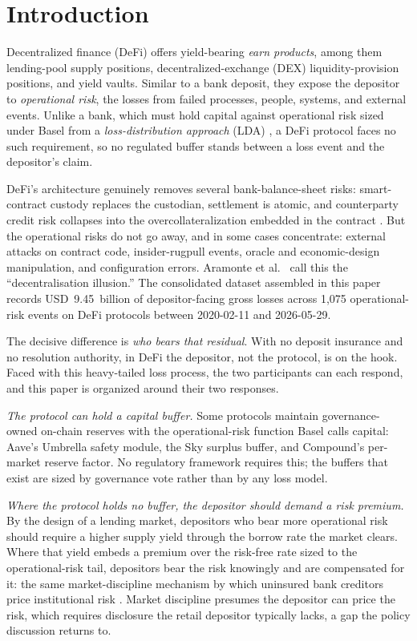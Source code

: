 \documentclass[runningheads]{llncs}
\begin{document}
\section{Introduction}

Decentralized finance (DeFi) offers yield-bearing \emph{earn products},
among them lending-pool supply positions, decentralized-exchange (DEX) liquidity-provision positions,
and yield vaults. Similar to a bank deposit, they expose the depositor
to \emph{operational risk}, the losses from failed processes, people,
systems, and external events. Unlike a bank, which must hold capital
against operational risk sized under Basel from a
\emph{loss-distribution approach} (LDA)
\citep{Moscadelli2004,Fontnouvelle2006,Cope2009,Chernobai2008}, a DeFi
protocol faces no such requirement, so no regulated buffer stands
between a loss event and the depositor's claim.

DeFi's architecture genuinely removes several bank-balance-sheet risks:
smart-contract custody replaces the custodian, settlement is atomic,
and counterparty credit risk collapses into the overcollateralization
embedded in the contract \citep{Werner2022,Auer2024}. But the
operational risks do not go away, and in some cases concentrate:
external attacks on contract code, insider-rugpull events, oracle and
economic-design manipulation, and configuration errors. Aramonte et
al.~\cite{Aramonte2021} call this the ``decentralisation illusion.''
The consolidated dataset assembled in this paper records
USD~9.45~billion of depositor-facing gross losses across 1{,}075
operational-risk events on DeFi protocols between 2020-02-11 and 2026-05-29.

The decisive difference is \emph{who bears that residual}. With no
deposit insurance and no resolution authority, in DeFi the depositor,
not the protocol, is on the hook. Faced with this heavy-tailed loss
process, the two participants can each respond, and this paper is
organized around their two responses.

\emph{The protocol can hold a capital buffer.} Some protocols maintain
governance-owned on-chain reserves with the operational-risk function
Basel calls capital: Aave's Umbrella safety module, the Sky surplus buffer, and Compound's per-market reserve factor. No
regulatory framework requires this; the buffers that exist are sized
by governance vote rather than by any loss model.

\emph{Where the protocol holds no buffer, the depositor should demand
a risk premium.} By the design of a lending market, depositors who
bear more operational risk should require a higher supply yield through
the borrow rate the market clears. Where that yield embeds a premium
over the risk-free rate sized to the operational-risk tail, depositors
bear the risk knowingly and are compensated for it: the same
market-discipline mechanism by which uninsured bank creditors price
institutional risk \citep{Flannery1998,Egan2017}. Market discipline
presumes the depositor can price the risk, which requires disclosure
the retail depositor typically lacks, a gap the policy discussion
returns to.
\end{document}
